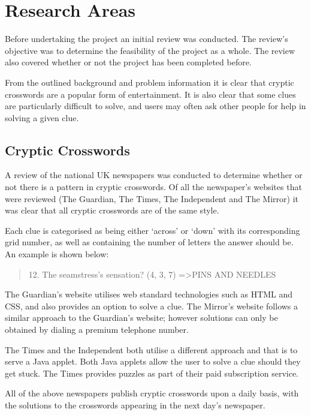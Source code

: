 \section{Research Areas}

Before undertaking the project an initial review was conducted. The review's 
objective was to determine the feasibility of the project as a whole. The 
review also covered whether or not the project has been completed before.

From the outlined background and problem information it is clear that cryptic 
crosswords are a popular form of entertainment. It is also clear that some 
clues are particularly difficult to solve, and users may often ask other people
for help in solving a given clue.


\subsection{Cryptic Crosswords}

A review of the national UK newspapers was conducted to determine whether or 
not there is a pattern in cryptic crosswords. Of all the newspaper's websites 
that were reviewed (The Guardian, The Times, The Independent and The Mirror) it 
was clear that all cryptic crosswords are of the same style.

Each clue is categorised as being either `across' or `down' with its 
corresponding grid number, as well as containing the number of letters the 
answer should be. An example is shown below:

\begin{quote}
12. The seamstress's sensation? (4, 3, 7) =\textgreater  PINS AND NEEDLES
\end{quote}

The Guardian's website utilises web standard technologies such as HTML and CSS, 
and also provides an option to solve a clue. The Mirror's website follows a 
similar approach to the Guardian's website; however solutions can only be 
obtained by dialing a premium telephone number.

The Times and the Independent both utilise a different approach and that is to 
serve a Java applet. Both Java applets allow the user to solve a clue should 
they get stuck. The Times provides puzzles as part of their paid subscription 
service.

All of the above newspapers publish cryptic crosswords upon a daily basis, with
the solutions to the crosswords appearing in the next day's newspaper.

